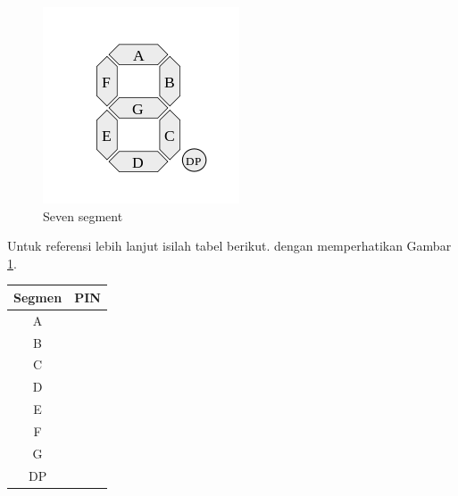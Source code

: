 \begin{figure}[H]
\centering
\includegraphics[scale=0.5]{images/sseg.png}
\par
\caption{Seven segment}\label{fig:sseg}
\end{figure}

Untuk referensi lebih lanjut isilah tabel berikut. dengan memperhatikan Gambar
\ref{fig:sseg}.

\begin{table}[H]
\centering
\begin{tabular}{|c|c|}
\hline
Segmen & PIN \\
\hline
A & \\
\hline
B & \\
\hline
C & \\
\hline
D & \\
\hline
E & \\
\hline
F & \\
\hline
G & \\
\hline
DP & \\
\hline
\end{tabular}
\end{table}
